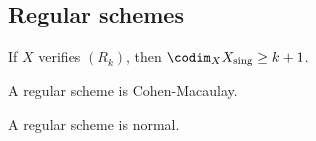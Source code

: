     
\subsection{Regular schemes}


    \begin{proposition}
        If $X$ verifies $(R_k)$, then $\codim_X X_{\text{sing}} \geq k+1$.
    \end{proposition}

    \begin{proposition}
        A regular scheme is Cohen-Macaulay.
    \end{proposition}

    \begin{corollary}
        A regular scheme is normal.
    \end{corollary}



